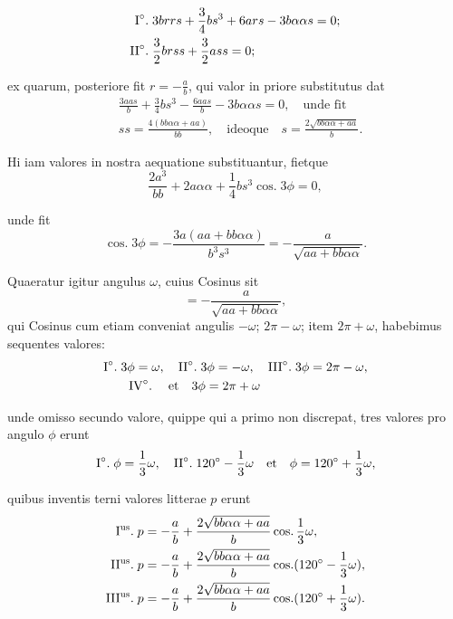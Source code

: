 \documentclass[10pt,a4paper]{article}
\DeclareMathOperator{\cosg}{cos.}
\begin{document}
\begin{paracol}{2}
\begin{enumerate}[topsep=1px]
		\begin{align*}
			\text{I}\degree.\; &3brrs + \frac{3}{4}bs^3+6ars-3b\alpha \alpha s = 0;\\
			\text{II}\degree.\;& \frac{3}{2}brss+\frac{3}{2}ass = 0;
		\end{align*}
		\par ex quarum, posteriore fit $r=-\frac{a}{b}$, qui valor in priore substitutus dat
		\begin{align*}
			&\frac{3aas}{b}+\frac{3}{4}bs^3-\frac{6aas}{b}-3b\alpha \alpha s = 0, \quad \text{unde fit}\\
			&ss = \frac{4(bb\alpha \alpha + aa)}{bb}, \quad \text{ideoque} \quad s = \frac{2\sqrt{bb\alpha \alpha + aa}}{b}.
		\end{align*}
		\par Hi iam valores in nostra aequatione substituantur, fietque
		\[
			\frac{2a^3}{bb}+2a\alpha \alpha + \frac{1}{4}bs^3\cosg 3\phi = 0,
		\]
		\par unde fit
		\[
			\cosg 3\phi = - \frac{3a(aa + bb\alpha \alpha)}{b^3s^3} =-\frac{a}{\sqrt{aa+bb\alpha \alpha}}.
		\]
		\par Quaeratur igitur angulus $\omega$, cuius Cosinus sit
		\[
			= -\frac{a}{\sqrt{aa+bb\alpha \alpha}},
		\]
		qui Cosinus cum etiam conveniat angulis $-\omega$; $2\pi - \omega$; item $2\pi + \omega$, habebimus sequentes valores:
		\begin{align*}
			&\text{I}\degree.\;3\phi = \omega, \quad \text{II}\degree.\; 3\phi = -\omega, \quad \text{III}\degree.\; 3\phi = 2\pi - \omega, \\
			&\qquad \text{IV}\degree.\; \quad \text{et} \quad 3\phi = 2\pi+\omega
		\end{align*}
		\par unde omisso secundo valore, quippe qui a primo non discrepat, tres valores pro angulo $\phi$ erunt
		\[
			\text{I}\degree.\; \phi = \frac{1}{3}\omega, \quad \text{II}\degree.\; 120\degree - \frac{1}{3}\omega \quad \text{et}\quad  \phi = 120\degree +\frac{1}{3}\omega,
		\]
		\par quibus inventis terni valores litterae $p$ erunt
		\begin{align*}
			\text{I\textsuperscript{us}.}\;  p &= -\frac{a}{b}+\frac{2\sqrt{bb\alpha \alpha + aa}}{b} \cosg \frac{1}{3} \omega,\\
			\text{II\textsuperscript{us}.}\; p &= -\frac{a}{b}+\frac{2\sqrt{bb\alpha \alpha + aa}}{b} \cosg (120\degree - \frac{1}{3}\omega),\\
			\text{III\textsuperscript{us}.}\; p & = -\frac{a}{b}+\frac{2\sqrt{bb\alpha \alpha+aa}}{b} \cosg (120\degree + \frac{1}{3}\omega).
		\end{align*}
		

\end{enumerate}
\end{paracol}
\end{document}

